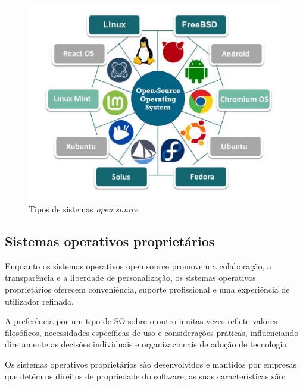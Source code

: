 \begin{figure}[H]
  \centering
  \includegraphics[scale=1.5]{Figures/0. General/sistemas_open_source.jpg}
  \caption{Tipos de sistemas \textit{open source}}
  \label{Tipos de sistemas open source}
\end{figure}

\newpage
\subsection{Sistemas operativos proprietários}
Enquanto os sistemas operativos open source promovem a colaboração, a transparência e a liberdade de personalização, os sistemas operativos proprietários oferecem conveniência, suporte profissional e uma experiência de utilizador refinada. \cite{advantagesOfProprietary}
\par \vspace{6pt}
A preferência por um tipo de SO sobre o outro muitas vezes reflete valores filosóficos, necessidades específicas de uso e considerações práticas, influenciando diretamente as decisões individuais e organizacionais de adoção de tecnologia.
\par \vspace{6pt}
Os sistemas operativos proprietários são desenvolvidos e mantidos por empresas que detêm os direitos de propriedade do software, as suas características são:

